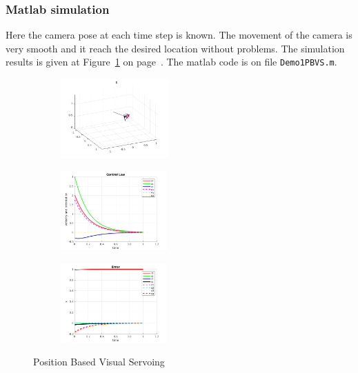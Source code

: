 \documentclass[a4paper,12pt]{article}
\begin{document}
\subsubsection{Matlab simulation}
Here the camera pose at each time step is known. The movement of the camera is very smooth and it reach the desired location without problems. The simulation results is given at Figure~\ref{fig:pbvsr} on page~\pageref{fig:pbvsr}. The matlab code is on file \texttt{Demo1PBVS.m}.
\begin{figure}[bt!] 
         \begin{subfigure}[b]{0.32\textwidth}
                \centering
                \includegraphics[height=1.2in]{../results/PBVS3.png}
                 \end{subfigure}
         \begin{subfigure}[b]{0.2\textwidth}
                \centering
                \includegraphics[height=1.2in]{../results/PBVS2.png}
                 \end{subfigure}%
         \begin{subfigure}[b]{0.32\textwidth}
                \centering
                \includegraphics[height=1.2in]{../results/PBVS1.png}
                 \end{subfigure}%
         \caption{Position Based Visual Servoing} 
        \label{fig:pbvsr} 
\end{figure}
\end{document}
